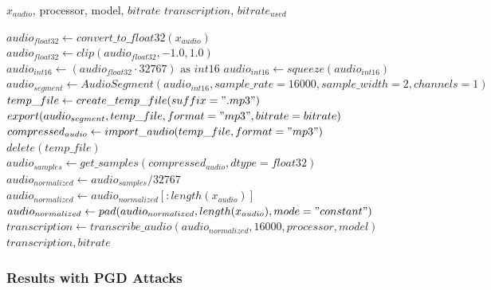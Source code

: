 \documentclass[a4paper,12pt]{article}
\begin{document}
\begin{algorithm}
\caption{MP3 Compression Defense}
\begin{algorithmic}[1]
\Require $x_{audio}$, processor, model, $bitrate$ 
\Ensure $transcription$, $bitrate_{used}$ 

\State $audio_{float32} \gets convert\_to\_float32(x_{audio})$ 
\State $audio_{float32} \gets clip(audio_{float32}, -1.0, 1.0)$ 
\State $audio_{int16} \gets (audio_{float32} \cdot 32767) \text{ as } int16$ 
    \State $audio_{int16} \gets squeeze(audio_{int16})$ 
\EndIf
\State $audio_{segment} \gets AudioSegment(audio_{int16}, sample\_rate=16000, sample\_width=2, channels=1)$ 
\State $temp\_file \gets create\_temp\_file(suffix=".mp3")$ 
\State $export(audio_{segment}, temp\_file, format="mp3", bitrate=bitrate)$ 
\State $compressed_{audio} \gets import\_audio(temp\_file, format="mp3")$ 
\State $delete(temp\_file)$ 
\State $audio_{samples} \gets get\_samples(compressed_{audio}, dtype=float32)$ 
\State $audio_{normalized} \gets audio_{samples} / 32767$ 
        \State $audio_{normalized} \gets audio_{normalized}[:length(x_{audio})]$ 
    \Else
        \State $audio_{normalized} \gets pad(audio_{normalized}, length(x_{audio}), mode="constant")$ 
    \EndIf
\EndIf
\State $transcription \gets transcribe\_audio(audio_{normalized}, 16000, processor, model)$ 
\State \Return $transcription, bitrate$ 
\end{algorithmic}
\end{algorithm}

\newpage
\subsubsection{Results with PGD Attacks}
\end{document}
